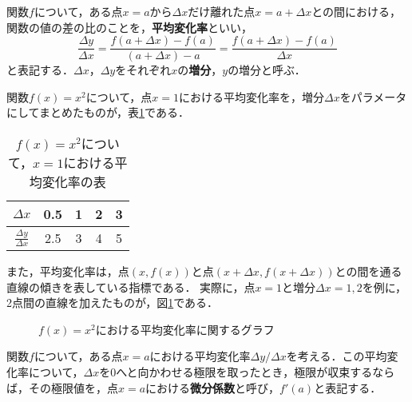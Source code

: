 \afterpage{\clearpage}
\newpage
\begin{definition}[平均変化率]
	関数$f$について，ある点$x = a$から$\Delta x$だけ離れた点$x = a + \Delta x$との間における，関数の値の差の比のことを，\textbf{平均変化率}といい，
	\[
		\frac{\Delta y}{\Delta x} = \frac{f(a+\Delta x) - f(a)}{(a+\Delta x) - a} = \frac{f(a+\Delta x) - f(a)}{\Delta x}
	\]
	と表記する．$\Delta x$，$\Delta y$をそれぞれ$x$の\textbf{増分}，$y$の増分と呼ぶ．
\end{definition}
\begin{example*}
	関数$f(x) = x^2$について，点$x = 1$における平均変化率を，増分$\Delta x$をパラメータにしてまとめたものが，表\ref{table:averageRate}である．
	\begin{table}[!h]
		\centering
		\caption{$f(x) = x^2$について，$x=1$における平均変化率の表}
		\label{table:averageRate}
		\begin{tabular}{c|cccc}
			$\Delta x$ & 0.5 & 1 & 2 & 3 \\
			\hline
			$\displaystyle \frac{\Delta y}{\Delta x}$ & 2.5 & 3 & 4 & 5 \\
		\end{tabular}
	\end{table}

	また，平均変化率は，点$\left(x, f(x)\right)$と点$\left(x+\Delta x, f\left(x+\Delta x\right)\right)$との間を通る直線の傾きを表している指標である．
	実際に，点$x = 1$と増分$\Delta x = 1, 2$を例に，2点間の直線を加えたものが，図\ref{fig:averageRate}である．
	\begin{figure}[!h]
		\centering
		\caption{$f(x) = x^2$における平均変化率に関するグラフ}
		\label{fig:averageRate}
	\end{figure}
\end{example*}
\afterpage{\clearpage}
\newpage
\begin{definition}[微分係数]
	関数$f$について，ある点$x = a$における平均変化率$\Delta y / \Delta x$を考える．この平均変化率について，$\Delta x$を$0$へと向かわせる極限を取ったとき，極限が収束するならば，その極限値を，点$x = a$における\textbf{微分係数}と呼び，$f'(a)$と表記する．
\end{definition}

